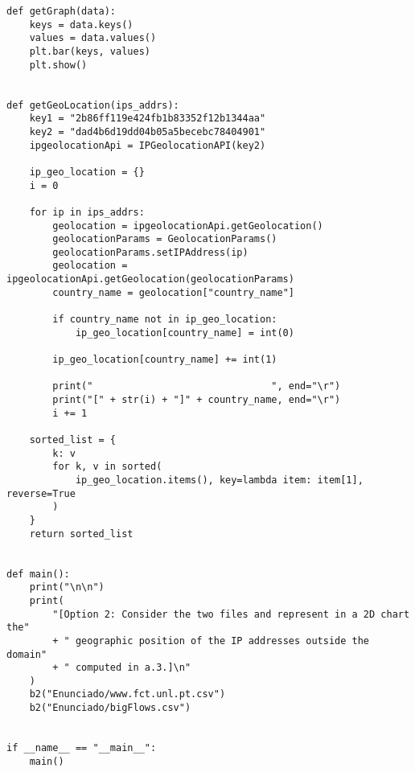 \begin{lstlisting}
def getGraph(data):
    keys = data.keys()
    values = data.values()
    plt.bar(keys, values)
    plt.show()


def getGeoLocation(ips_addrs):
    key1 = "2b86ff119e424fb1b83352f12b1344aa"
    key2 = "dad4b6d19dd04b05a5becebc78404901"
    ipgeolocationApi = IPGeolocationAPI(key2)

    ip_geo_location = {}
    i = 0

    for ip in ips_addrs:
        geolocation = ipgeolocationApi.getGeolocation()
        geolocationParams = GeolocationParams()
        geolocationParams.setIPAddress(ip)
        geolocation = ipgeolocationApi.getGeolocation(geolocationParams)
        country_name = geolocation["country_name"]

        if country_name not in ip_geo_location:
            ip_geo_location[country_name] = int(0)

        ip_geo_location[country_name] += int(1)

        print("                               ", end="\r")
        print("[" + str(i) + "]" + country_name, end="\r")
        i += 1

    sorted_list = {
        k: v
        for k, v in sorted(
            ip_geo_location.items(), key=lambda item: item[1], reverse=True
        )
    }
    return sorted_list


def main():
    print("\n\n")
    print(
        "[Option 2: Consider the two files and represent in a 2D chart the"
        + " geographic position of the IP addresses outside the domain"
        + " computed in a.3.]\n"
    )
    b2("Enunciado/www.fct.unl.pt.csv")
    b2("Enunciado/bigFlows.csv")


if __name__ == "__main__":
    main()

\end{lstlisting}